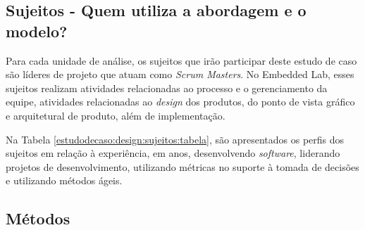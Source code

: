 \subsection{Sujeitos - Quem utiliza a abordagem e o modelo?}
\label{estudodecaso:design:sujeitos}

Para cada unidade de análise, os sujeitos que irão participar deste estudo de caso são líderes de projeto que atuam como \textit{Scrum Masters}. No Embedded Lab, esses sujeitos realizam atividades relacionadas ao processo e o gerenciamento da equipe, atividades relacionadas ao \textit{design} dos produtos, do ponto de vista gráfico e arquitetural de produto, além de implementação.

Na Tabela \ref{estudodecaso:design:sujeitos:tabela}, são apresentados os perfis dos sujeitos em relação à experiência, em anos, desenvolvendo \textit{software}, liderando projetos de desenvolvimento, utilizando métricas no suporte à tomada de decisões e utilizando métodos ágeis.

\begin{table}[ht!]
\centering
\caption{Perfis dos Sujeitos.}
\label{estudodecaso:design:sujeitos:tabela}
\end{table}

\subsection{Métodos}
\label{estudodecaso:design:metodos}

